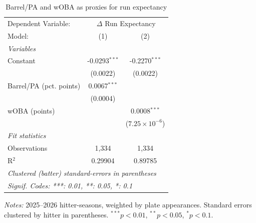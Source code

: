 \begin{table}[H]
\centering
\caption{Barrel/PA and wOBA as proxies for run expectancy}
\label{tab:proxy}
\begin{tabular}{lcc}
   \tabularnewline \midrule \midrule
   Dependent Variable: & \multicolumn{2}{c}{$\Delta$ Run Expectancy}\\
   Model:                  & (1)             & (2)\\  
   \midrule
   \emph{Variables}\\
   Constant                & -0.0293$^{***}$ & -0.2270$^{***}$\\   
                           & (0.0022)        & (0.0022)\\   
   Barrel/PA (pct. points) & 0.0067$^{***}$  &   \\   
                           & (0.0004)        &   \\   
   wOBA (points)           &                 & 0.0008$^{***}$\\   
                           &                 & ($7.25\times 10^{-6}$)\\    
   \midrule
   \emph{Fit statistics}\\
   Observations            & 1,334           & 1,334\\  
   R$^2$                   & 0.29904         & 0.89785\\  
   \midrule \midrule
   \multicolumn{3}{l}{\emph{Clustered (batter) standard-errors in parentheses}}\\
   \multicolumn{3}{l}{\emph{Signif. Codes: ***: 0.01, **: 0.05, *: 0.1}}\\
\end{tabular}

\vspace{4pt}
\begin{minipage}{0.8\textwidth}
\centering\footnotesize
\textit{Notes:} 2025--2026 hitter-seasons, weighted by plate appearances. Standard errors clustered by hitter in parentheses. $^{***}p<0.01$, $^{**}p<0.05$, $^{*}p<0.1$.
\end{minipage}
\end{table}
